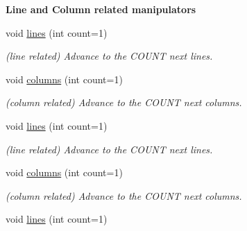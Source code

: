 \begin{Indent}{\bf Line and Column related manipulators}\par
\begin{DoxyCompactItemize}
\item 
\hypertarget{classyy_1_1position_a4fbdd03b4e09fa8755d79d3e675d6d3a}{void \hyperlink{classyy_1_1position_a4fbdd03b4e09fa8755d79d3e675d6d3a}{lines} (int count=1)}\label{classyy_1_1position_a4fbdd03b4e09fa8755d79d3e675d6d3a}

\begin{DoxyCompactList}\small\item\em (line related) Advance to the C\-O\-U\-N\-T next lines. \end{DoxyCompactList}\item 
\hypertarget{classyy_1_1position_ab15e0388c4fd433aa19c2435e49f72e9}{void \hyperlink{classyy_1_1position_ab15e0388c4fd433aa19c2435e49f72e9}{columns} (int count=1)}\label{classyy_1_1position_ab15e0388c4fd433aa19c2435e49f72e9}

\begin{DoxyCompactList}\small\item\em (column related) Advance to the C\-O\-U\-N\-T next columns. \end{DoxyCompactList}\item 
\hypertarget{classyy_1_1position_a4fbdd03b4e09fa8755d79d3e675d6d3a}{void \hyperlink{classyy_1_1position_a4fbdd03b4e09fa8755d79d3e675d6d3a}{lines} (int count=1)}\label{classyy_1_1position_a4fbdd03b4e09fa8755d79d3e675d6d3a}

\begin{DoxyCompactList}\small\item\em (line related) Advance to the C\-O\-U\-N\-T next lines. \end{DoxyCompactList}\item 
\hypertarget{classyy_1_1position_ab15e0388c4fd433aa19c2435e49f72e9}{void \hyperlink{classyy_1_1position_ab15e0388c4fd433aa19c2435e49f72e9}{columns} (int count=1)}\label{classyy_1_1position_ab15e0388c4fd433aa19c2435e49f72e9}

\begin{DoxyCompactList}\small\item\em (column related) Advance to the C\-O\-U\-N\-T next columns. \end{DoxyCompactList}\item 
\hypertarget{classyy_1_1position_a4fbdd03b4e09fa8755d79d3e675d6d3a}{void \hyperlink{classyy_1_1position_a4fbdd03b4e09fa8755d79d3e675d6d3a}{lines} (int count=1)}\label{classyy_1_1position_a4fbdd03b4e09fa8755d79d3e675d6d3a}


\end{DoxyCompactItemize}
\end{Indent}
